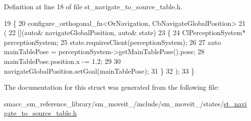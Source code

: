 Definition at line 18 of file st\+\_\+navigate\+\_\+to\+\_\+source\+\_\+table.\+h.


\begin{DoxyCode}
19         \{
20             configure\_orthogonal\_fn<OrNavigation, CbNavigateGlobalPosition>
21             (
22                 [](\textcolor{keyword}{auto}& navigateGlobalPosition, \textcolor{keyword}{auto}& state)
23                 \{
24                     ClPerceptionSystem* perceptionSystem;
25                     state.requiresClient(perceptionSystem);
26                     
27                     \textcolor{keyword}{auto} mainTablePose = perceptionSystem->getMainTablePose().pose;
28                     mainTablePose.position.x -= 1.2;
29 
30                     navigateGlobalPosition.setGoal(mainTablePose);
31                 \}
32             );
33         \}
\end{DoxyCode}


The documentation for this struct was generated from the following file\+:\begin{DoxyCompactItemize}
\item 
smacc\+\_\+sm\+\_\+reference\+\_\+library/sm\+\_\+moveit\+\_/include/sm\+\_\+moveit\+\_/states/\hyperlink{st__navigate__to__source__table_8h}{st\+\_\+navigate\+\_\+to\+\_\+source\+\_\+table.\+h}\end{DoxyCompactItemize}
